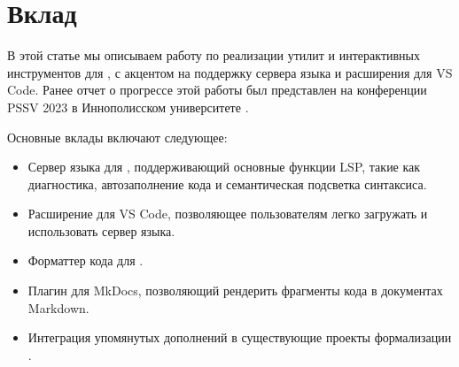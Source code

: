 \section{Вклад}

В этой статье мы описываем работу по реализации утилит и интерактивных инструментов для \Rzk{},
с акцентом на поддержку сервера языка и расширения для VS Code.
Ранее отчет о прогрессе этой работы был представлен на конференции PSSV 2023
в Иннополисском университете \cite{PSSV2023}.

Основные вклады включают следующее:
\begin{itemize}
  \item Сервер языка для \Rzk{}, поддерживающий основные функции LSP, такие как диагностика, автозаполнение кода и семантическая подсветка синтаксиса.
  \item Расширение для VS Code, позволяющее пользователям легко загружать и использовать сервер языка.
  \item Форматтер кода для \Rzk{}.
  \item Плагин для MkDocs, позволяющий рендерить фрагменты кода \Rzk{} в документах Markdown.
  \item Интеграция упомянутых дополнений в существующие проекты формализации \Rzk{}.
\end{itemize}
